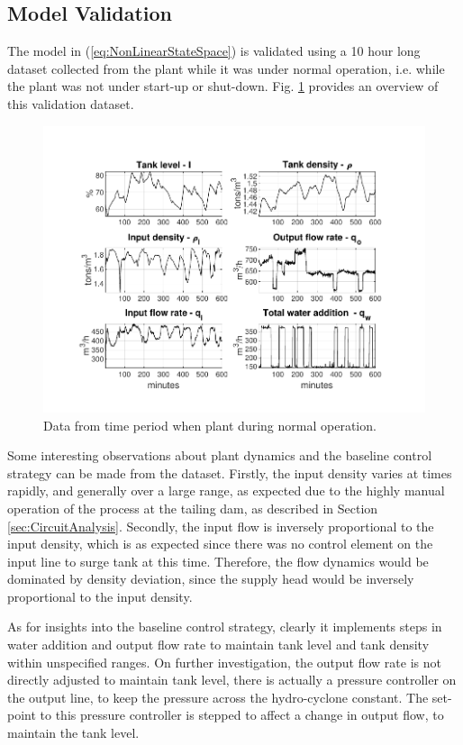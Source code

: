 \documentclass[preprint,authoryear,12pt]{elsarticle}
\begin{document}
\subsection{Model Validation}\label{sec:ModelValidation}
The model in (\ref{eq:NonLinearStateSpace}) is validated using a 10 hour long dataset collected from the plant while it was under normal operation, i.e. while the plant was not under start-up or shut-down. Fig. \ref{fig:DataSet} provides an overview of this validation dataset.
\begin{figure}[h!]
	\centering
	\includegraphics[trim={0.8cm, 0.8cm, 0.8cm, 0.8cm}, clip, width=\textwidth]{data_inspection.pdf}
	\caption{Data from time period when plant during normal operation.}
	\label{fig:DataSet}
\end{figure}

Some interesting observations about plant dynamics and the baseline control strategy can be made from the dataset. Firstly, the input density varies at times rapidly, and generally over a large range, as expected due to the highly manual operation of the process at the tailing dam, as described in Section \ref{sec:CircuitAnalysis}. Secondly, the input flow is inversely proportional to the input density, which is as expected since there was no control element on the input line to surge tank at this time. Therefore, the flow dynamics would be dominated by density deviation, since the supply head would be inversely proportional to the input density. 

As for insights into the baseline control strategy, clearly it implements steps in water addition and output flow rate to maintain tank level and tank density within unspecified ranges. On further investigation, the output flow rate is not directly adjusted to maintain tank level, there is actually a pressure controller on the output line, to keep the pressure across the hydro-cyclone constant. The set-point to this pressure controller is stepped to affect a change in output flow, to maintain the tank level.
\end{document}
